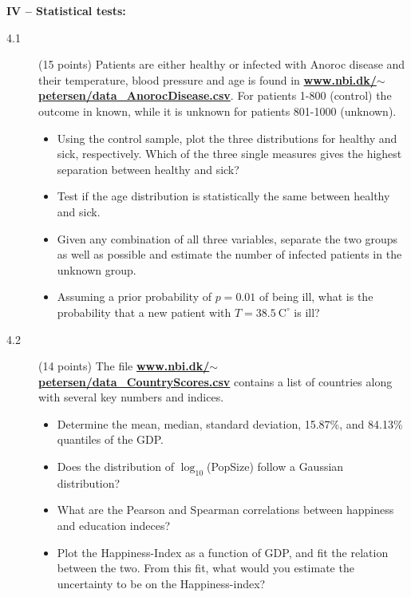 \documentclass[11pt]{article}
\begin{document}
\noindent
{\bf IV -- Statistical tests:}
\begin{description}
\item[4.1] (15 points)
  Patients are either healthy or infected with Anoroc disease and their temperature, blood pressure and age is found in
  \href{http://www.nbi.dk/~petersen/data\_AnorocDisease.txt}{\bf www.nbi.dk/$\sim$petersen/data\_AnorocDisease.csv}.
  For patients 1-800 (control) the outcome in known, while it is unknown for patients 801-1000 (unknown).
  \vspace*{-1ex}
  \begin{itemize}
    \item Using the control sample, plot the three distributions for healthy and sick, respectively.
      Which of the three single measures gives the highest separation between healthy and sick?
    \item Test if the age distribution is statistically the same between healthy and sick.
    \item Given any combination of all three variables, separate the two groups as well as possible
      and estimate the number of infected patients in the unknown group.
    \item Assuming a prior probability of $p=0.01$ of being ill, what is the probability that a new patient with
      $T = 38.5~ \mbox{C}^{\circ}$ is ill?
  \end{itemize}
\item[4.2] (14 points)
  The file \href{http://www.nbi.dk/~petersen/data\_CountryScores.txt}{\bf www.nbi.dk/$\sim$petersen/data\_CountryScores.csv}
  contains a list of countries along with several key numbers and indices.
  \vspace*{-1ex}
  \begin{itemize}
    \item Determine the mean, median, standard deviation, 15.87\%, and 84.13\% quantiles of the GDP.
    \item Does the distribution of $\log_{10}$(PopSize) follow a Gaussian distribution?
    \item What are the Pearson and Spearman correlations between happiness and education indeces?
    \item Plot the Happiness-Index as a function of GDP, and fit the relation between the two.
      From this fit, what would you estimate the uncertainty to be on the Happiness-index?
  \end{itemize}
\end{description}
\end{document}
